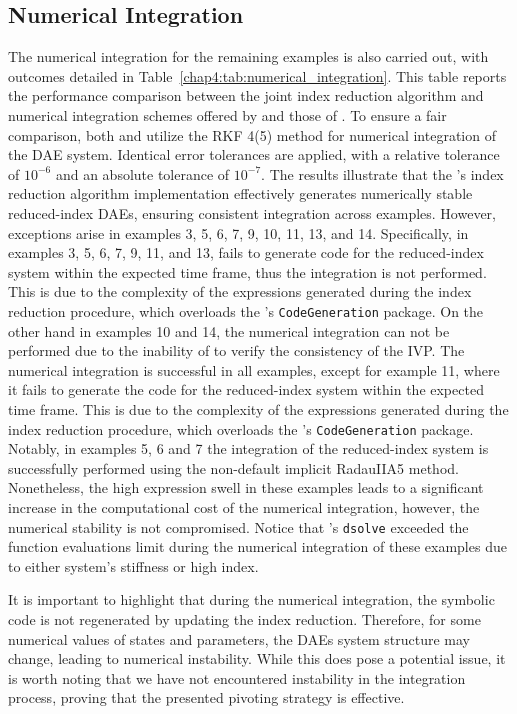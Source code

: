 \subsection{Numerical Integration}

The numerical integration for the remaining examples is also carried out, with outcomes detailed in Table~\ref{chap4:tab:numerical_integration}. This table reports the performance comparison between the joint index reduction algorithm and numerical integration schemes offered by \Maple{} and those of \Indigo{}. To ensure a fair comparison, both \Maple{} and \Indigo{} utilize the \ac{RKF} 4(5) method for numerical integration of the \ac{DAE} system. Identical error tolerances are applied, with a relative tolerance of $10^{-6}$ and an absolute tolerance of $10^{-7}$. The results illustrate that the \Indigo{}'s index reduction algorithm implementation effectively generates numerically stable reduced-index \acp{DAE}, ensuring consistent integration across examples. However, exceptions arise in examples 3, 5, 6, 7, 9, 10, 11, 13, and 14. Specifically, in examples 3, 5, 6, 7, 9, 11, and 13, \Maple{} fails to generate code for the reduced-index system within the expected time frame, thus the integration is not performed. This is due to the complexity of the expressions generated during the index reduction procedure, which overloads the \Maple{}'s \texttt{CodeGeneration} package. On the other hand in examples 10 and 14, the numerical integration can not be performed due to the inability of \Maple{} to verify the consistency of the \ac{IVP}. The \Indigo{} numerical integration is successful in all examples, except for example 11, where it fails to generate the code for the reduced-index system within the expected time frame. This is due to the complexity of the expressions generated during the index reduction procedure, which overloads the \Indigo{}'s \texttt{CodeGeneration} package. Notably, in examples 5, 6 and 7 the integration of the reduced-index system is successfully performed using the non-default implicit RadauIIA5 method. Nonetheless, the high expression swell in these examples leads to a significant increase in the computational cost of the numerical integration, however, the numerical stability is not compromised. Notice that \Maple{}'s \texttt{dsolve} exceeded the function evaluations limit during the numerical integration of these examples due to either system's stiffness or high index.

It is important to highlight that during the numerical integration, the symbolic code is not regenerated by updating the index reduction. Therefore, for some numerical values of states and parameters, the \acp{DAE} system structure may change, leading to numerical instability. While this does pose a potential issue, it is worth noting that we have not encountered instability in the integration process, proving that the presented pivoting strategy is effective.



